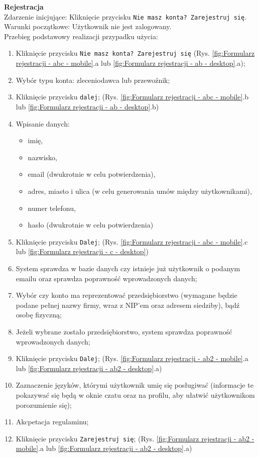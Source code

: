 \textbf{Rejestracja} \\
Zdarzenie inicjujące: Kliknięcie przycisku \texttt{Nie masz konta? Zarejestruj się}. \\
Warunki początkowe: Użytkownik nie jest zalogowany. \\
Przebieg podstawowy realizacji przypadku użycia:
\begin{enumerate}
    \item Kliknięcie przycisku \texttt{Nie masz konta? Zarejestruj się} (Rys. \ref{fig:Formularz rejestracji - abc - mobile}.a lub \ref{fig:Formularz rejestracji - ab - desktop}.a);
    \item Wybór typu konta: zleceniodawca lub przewoźnik;
    \item Kliknięcie przycisku \texttt{dalej}; (Rys. \ref{fig:Formularz rejestracji - abc - mobile}.b lub \ref{fig:Formularz rejestracji - ab - desktop}.b)
    \item Wpisanie danych:
        \begin{itemize}
            \item imię,
            \item nazwisko,
            \item email (dwukrotnie w celu potwierdzenia),
            \item adres, miasto i ulica (w celu generowania umów między użytkownikami),
            \item numer telefonu,
            \item hasło (dwukrotnie w celu potwierdzenia)
        \end{itemize}
    \item Kliknięcie przycisku \texttt{Dalej}; (Rys. \ref{fig:Formularz rejestracji - abc - mobile}.c lub \ref{fig:Formularz rejestracji - c - desktop})
    \item System sprawdza w bazie danych czy istnieje już użytkownik o podanym emailu oraz sprawdza poprawność wprowadzonych danych;
    \item Wybór czy konto ma reprezentować przedsiębiorstwo (wymagane będzie podane pełnej nazwy firmy, wraz z NIP'em oraz adresem siedziby), bądź osobę fizyczną;
    \item Jeżeli wybrane zostało przedsiębiorstwo, system sprawdza poprawność wprowadzonych danych;
    \item Kliknięcie przycisku \texttt{Dalej}; (Rys. \ref{fig:Formularz rejestracji - ab2 - mobile}.a lub \ref{fig:Formularz rejestracji - ab2 - desktop}.a)
    \item Zaznaczenie języków, którymi użytkownik umię się posługiwać (informacje te pokazywać się będą w oknie czatu oraz na profilu, aby ułatwić użytkownikom porozumienie się);
    \item Akcpetacja regulaminu;
    \item Kliknięcie przycisku \texttt{Zarejestruj się}; (Rys. \ref{fig:Formularz rejestracji - ab2 - mobile}.a lub \ref{fig:Formularz rejestracji - ab2 - desktop}.a)
\end{enumerate}
